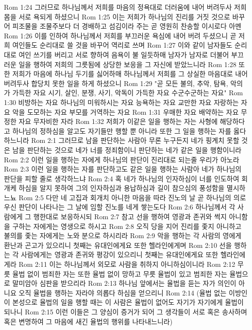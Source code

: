 Rom 1:24  그러므로 하나님께서 저희를 마음의 정욕대로 더러움에 내어 버려두사 저희 몸을 서로 욕되게 하셨으니
Rom 1:25  이는 저희가 하나님의 진리를 거짓 것으로 바꾸어 피조물을 조물주보다 더 경배하고 섬김이라 주는 곧 영원히 찬송할 이시로다 아멘
Rom 1:26  이를 인하여 하나님께서 저희를 부끄러운 욕심에 내어 버려 두셨으니 곧 저희 여인들도 순리대로 쓸 것을 바꾸어 역리로 쓰며
Rom 1:27  이와 같이 남자들도 순리대로 여인 쓰기를 버리고 서로 향하여 음욕이 불 일듯하매 남자가 남자로 더불어 부끄러운 일을 행하여 저희의 그릇됨에 상당한 보응을 그 자신에 받았느니라
Rom 1:28  또한 저희가 마음에 하나님 두기를 싫어하매 하나님께서 저희를 그 상실한 마음대로 내어 버려두사 합당치 못한 일을 하게 하셨으니
Rom 1:29  "곧 모든 불의, 추악, 탐욕, 악의가 가득한 자요 시기, 살인, 분쟁, 사기, 악독이 가득한 자요 수군수군하는 자요"
Rom 1:30  비방하는 자요 하나님의 미워하시는 자요 능욕하는 자요 교만한 자요 자랑하는 자요 악을 도모하는 자요 부모를 거역하는 자요
Rom 1:31  우매한 자요 배약하는 자요 무정한 자요 무자비한 자라
Rom 1:32  저희가 이같은 일을 행하는 자는 사형에 해당하다고 하나님의 정하심을 알고도 자기들만 행할 뿐 아니라 또한 그 일을 행하는 자를 옳다 하느니라
Rom 2:1  그러므로 남을 판단하는 사람아 무론 누구든지 네가 핑계치 못할 것은 남을 판단하는 것으로 네가 너를 정죄함이니 판단하는 네가 같은 일을 행함이니라
Rom 2:2  이런 일을 행하는 자에게 하나님의 판단이 진리대로 되는줄 우리가 아노라
Rom 2:3  이런 일을 행하는 자를 판단하고도 같은 일을 행하는 사람아 네가 하나님의 판단을 피할 줄로 생각하느냐
Rom 2:4  혹 네가 하나님의 인자하심이 너를 인도하여 회개케 하심을 알지 못하여 그의 인자하심과 용납하심과 길이 참으심의 풍성함을 멸시하느뇨
Rom 2:5  다만 네 고집과 회개치 아니한 마음을 따라 진노의 날 곧 하나님의 의로우신 판단이 나타나는 그 날에 임할 진노를 네게 쌓는도다
Rom 2:6  하나님께서 각 사람에게 그 행한대로 보응하시되
Rom 2:7  참고 선을 행하여 영광과 존귀와 썩지 아니함을 구하는 자에게는 영생으로 하시고
Rom 2:8  오직 당을 지어 진리를 좇지 아니하고 불의를 좇는 자에게는 노와 분으로 하시리라
Rom 2:9  악을 행하는 각 사람의 영에게 환난과 곤고가 있으리니 첫째는 유대인에게요 또한 헬라인에게며
Rom 2:10  선을 행하는 각 사람에게는 영광과 존귀와 평강이 있으리니 첫째는 유대인에게요 또한 헬라인에게라
Rom 2:11  이는 하나님께서 외모로 사람을 취하지 아니하심이니라
Rom 2:12  무릇 율법 없이 범죄한 자는 또한 율법 없이 망하고 무릇 율법이 있고 범죄한 자는 율법으로 말미암아 심판을 받으리라
Rom 2:13  하나님 앞에서는 율법을 듣는 자가 의인이 아니요 오직 율법을 행하는 자라야 의롭다 하심을 얻으리니
Rom 2:14  (율법 없는 이방인이 본성으로 율법의 일을 행할 때는 이 사람은 율법이 없어도 자기가 자기에게 율법이 되나니
Rom 2:15  이런 이들은 그 양심이 증거가 되어 그 생각들이 서로 혹은 송사하며 혹은 변명하여 그 마음에 새긴 율법의 행위를 나타내느니라)
